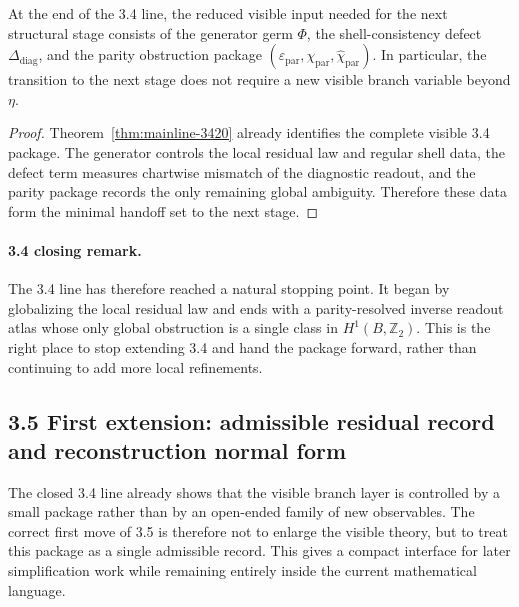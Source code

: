 \begin{corollary}
\label{cor:mainline-3420}
At the end of the 3.4 line, the reduced visible input needed for the next structural stage consists of the generator germ $\Phi$, the shell-consistency defect $\Delta_{\mathrm{diag}}$, and the parity obstruction package $(\varepsilon_{\mathrm{par}},\chi_{\mathrm{par}},\widehat\chi_{\mathrm{par}})$. In particular, the transition to the next stage does not require a new visible branch variable beyond $\eta$.
\end{corollary}

\begin{proof}
Theorem~\ref{thm:mainline-3420} already identifies the complete visible 3.4 package. The generator controls the local residual law and regular shell data, the defect term measures chartwise mismatch of the diagnostic readout, and the parity package records the only remaining global ambiguity. Therefore these data form the minimal handoff set to the next stage.
\end{proof}

\paragraph{3.4 closing remark.}
The 3.4 line has therefore reached a natural stopping point. It began by globalizing the local residual law and ends with a parity-resolved inverse readout atlas whose only global obstruction is a single class in $H^1(B,\mathbb Z_2)$. This is the right place to stop extending 3.4 and hand the package forward, rather than continuing to add more local refinements.



\subsection*{3.5 First extension: admissible residual record and reconstruction normal form}
The closed 3.4 line already shows that the visible branch layer is controlled by a small package rather than by an open-ended family of new observables. The correct first move of 3.5 is therefore not to enlarge the visible theory, but to treat this package as a single admissible record. This gives a compact interface for later simplification work while remaining entirely inside the current mathematical language.

